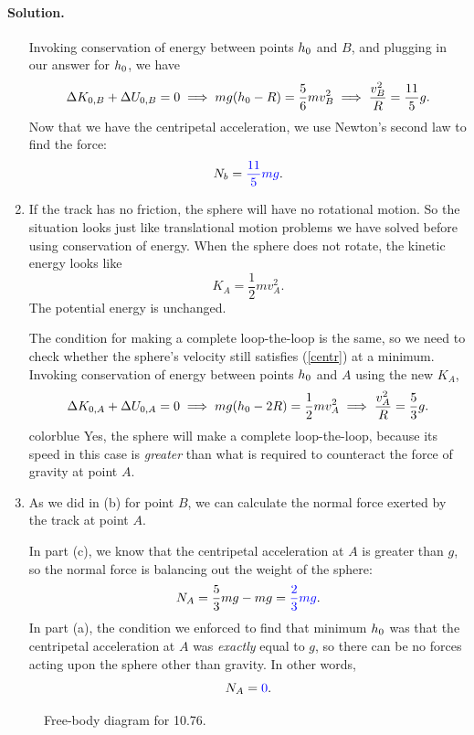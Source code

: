 \documentclass[11pt]{article}
\newcommand{\refeq}[1]{(\ref{#1})}
\newcommand{\beq}{\begin{equation*}}
\newcommand{\eeq}{\end{equation*}}
\newenvironment{solution}
{
    \paragraph{Solution.}
    \ignorespaces
}
{
    \bigskip
}
\begin{document}
\begin{solution}
\begin{enumerate}
		Invoking conservation of energy between points $h_0$ and $B$, and plugging in our answer for $h_0$, we have
			\beq
				\Delta K_{0,B} + \Delta U_{0,B} = 0 \implies mg (\ho - R) = \frac{5}{6} m v_B^2 \implies \frac{v_B^2}{R} = \frac{11}{5} g.
			\eeq
			Now that we have the centripetal acceleration, we use Newton's second law to find the force:
			\beq
				N_b = {\color{blue} \frac{11}{5} m g}.
			\eeq
			
		\item If the track has no friction, the sphere will have no rotational motion.  So the situation looks just like translational motion problems we have solved before using conservation of energy.  When the sphere does not rotate, the kinetic energy looks like
			\beq
				K_A = \frac{1}{2} m v_A^2.
			\eeq
			The potential energy is unchanged.
			
			The condition for making a complete loop-the-loop is the same, so we need to check whether the sphere's velocity still satisfies \refeq{centr} at a minimum.  Invoking conservation of energy between points $h_0$ and $A$ using the new $K_A$,
			\beq
				\Delta K_{0,A} + \Delta U_{0,A} = 0 \implies mg (\ho - 2R) = \frac{1}{2} m v_A^2 \implies \frac{v_A^2}{R} = \frac{5}{3} g.
			\eeq
			{color{blue} Yes}, the sphere will make a complete loop-the-loop, because its speed in this case is \emph{greater} than what is required to counteract the force of gravity at point $A$.
			
		\item As we did in (b) for point $B$, we can calculate the normal force exerted by the track at point $A$.
			
			In part (c), we know that the centripetal acceleration at $A$ is greater than $g$, so the normal force is balancing out the weight of the sphere:
			\beq
				N_A = \frac{5}{3} m g - m g = {\color{blue} \frac{2}{3} m g}.
			\eeq
			In part (a), the condition we enforced to find that minimum $h_0$ was that the centripetal acceleration at $A$ was \emph{exactly} equal to $g$, so there can be no forces acting upon the sphere other than gravity.  In other words,
			\beq
				N_A = {\color{blue} 0}.
			\eeq
	\end{enumerate}
\end{solution}


\clearpage
\begin{figure}
	\vspace{1.5in}
	\caption{Free-body diagram for 10.76.}
	\label{P10.76}
\end{figure}
\end{document}
